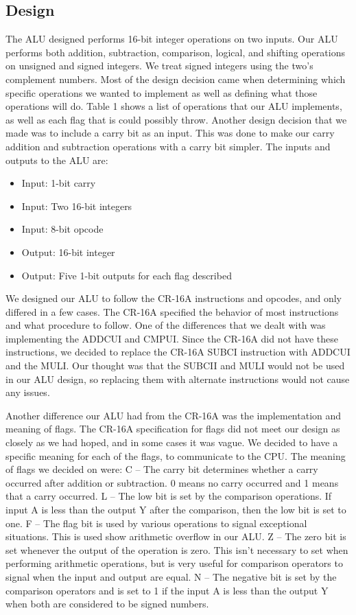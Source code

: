 \documentclass[letterpaper, 11 pt, conference]{article}
\begin{document}
\subsection{Design}
The ALU designed performs 16-bit integer operations on two inputs. Our ALU performs both addition, subtraction, comparison, logical, and shifting operations on unsigned and signed integers. We treat signed integers using the two’s complement numbers. Most of the design decision came when determining which specific operations we wanted to implement as well as defining what those operations will do. Table 1 shows a list of operations that our ALU implements, as well as each flag that is could possibly throw. Another design decision that we made was to include a carry bit as an input. This was done to make our carry addition and subtraction operations with a carry bit simpler. The inputs and outputs to the ALU are:
\begin{itemize}
\item Input: 1-bit carry 
\item Input: Two 16-bit integers
\item Input: 8-bit opcode
\item Output: 16-bit integer
\item Output: Five 1-bit outputs for each flag described
\end{itemize}
We designed our ALU to follow the CR-16A instructions and opcodes, and only differed in a few cases. The CR-16A specified the behavior of most instructions and what procedure to follow.  One of the differences that we dealt with was implementing the ADDCUI and CMPUI. Since the CR-16A did not have these instructions, we decided to replace the CR-16A SUBCI instruction with ADDCUI and the MULI. Our thought was that the SUBCII and MULI would not be used in our ALU design, so replacing them with alternate instructions would not cause any issues. 

Another difference our ALU had from the CR-16A was the implementation and meaning of flags. The CR-16A specification for flags did not meet our design as closely as we had hoped, and in some cases it was vague. We decided to have a specific meaning for each of the flags, to communicate to the CPU. The meaning of flags we decided on were:
C – The carry bit determines whether a carry occurred after addition or subtraction. 0 means no carry occurred and 1 means that a carry occurred.
L – The low bit is set by the comparison operations. If input A is less than the output Y after the comparison, then the low bit is set to one.
F – The flag bit is used by various operations to signal exceptional situations. This is used show arithmetic overflow in our ALU.
Z – The zero bit is set whenever the output of the operation is zero. This isn’t necessary to set when performing arithmetic operations, but is very useful for comparison operators to signal when the input and output are equal.
N – The negative bit is set by the comparison operators and is set to 1 if the input A is less than the output Y when both are considered to be signed numbers.
\end{document}
